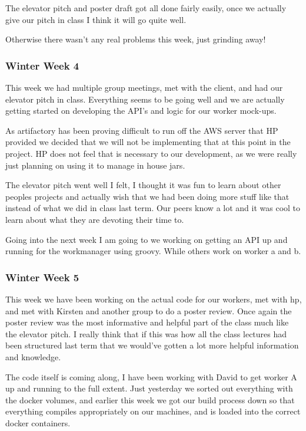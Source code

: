 \documentclass[onecolumn, draftclsnofoot,10pt, compsoc]{IEEEtran}
\begin{document}
The elevator pitch and poster draft got all done fairly easily, once we actually give our pitch in class I think it will go quite well.

Otherwise there wasn't any real problems this week, just grinding away!

\subsubsection*{Winter Week 4}
This week we had multiple group meetings, met with the client, and had our elevator pitch in class. Everything seems to be going well and we are actually getting started on developing the API's and logic for our worker mock-ups.

As artifactory has been proving difficult to run off the AWS server that HP provided we decided that we will not be implementing that at this point in the project. HP does not feel that is necessary to our development, as we were really just planning on using it to manage in house jars.

The elevator pitch went well I felt, I thought it was fun to learn about other peoples projects and actually wish that we had been doing more stuff like that instead of what we did in class last term. Our peers know a lot and it was cool to learn about what they are devoting their time to.

Going into the next week I am going to we working on getting an API up and running for the workmanager using groovy. While others work on worker a and b.

\subsubsection*{Winter Week 5}
This week we have been working on the actual code for our workers, met with hp, and met with Kirsten and another group to do a poster review. Once again the poster review was the most informative and helpful part of the class much like the elevator pitch. I really think that if this was how all the class lectures had been structured last term that we would've gotten a lot more helpful information and knowledge.

The code itself is coming along, I have been working with David to get worker A up and running to the full extent. Just yesterday we sorted out everything with the docker volumes, and earlier this week we got our build process down so that everything compiles appropriately on our machines, and is loaded into the correct docker containers.
\end{document}
